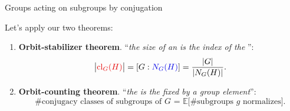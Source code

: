 \documentclass[8pt, handout]{beamer}
\newcommand{\Pause}{}      %
\begin{document}
\begin{frame}{Groups acting on subgroups by conjugation} %
  
  Let's apply our two theorems: 
  \begin{enumerate}
  \item \textbf{Orbit-stabilizer theorem}. ``\emph{the size of an
   is the index of the }'': \Pause
    \[
    \big|\Alert{\cl_G(H)}\big|=[G:\Balert{N_G(H)}]=\frac{|G|}{|N_G(H)|}.
    \]
    
    \vspace{-2mm}\Pause
    
  \item \textbf{Orbit-counting theorem}. ``\emph{the  is the  fixed by a
    group element}'': \Pause
    \[
    \text{\#conjugacy classes of subgroups of $G$ = $\mathbb{E}\big[\text{\# subgroups $g$ normalizes}\big]$}.
    \]
  \end{enumerate}
  
  \Pause\vspace{-1mm}
  

\end{frame}
\end{document}

